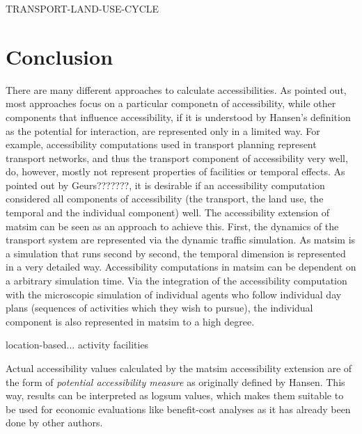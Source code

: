 
TRANSPORT-LAND-USE-CYCLE





\section{Conclusion}
There are many different approaches to calculate accessibilities. As pointed out, most approaches focus on a particular 
componetn of accessibility, while other components that influence accessibility, if it is understood by Hansen's definition 
as the potential for interaction, are represented only in a limited way. For example, accessibility computations used in 
transport planning represent transport networks, and thus the transport component of accessibility very well, do, however, 
mostly not represent properties of facilities or temporal effects. As pointed out by Geurs???????, it is desirable if an 
accessibility computation considered all components of accessibility (the transport, the land use, the temporal and the 
individual component) well. The accessibility extension of \gls{matsim} can be seen as an approach to achieve this. First, 
the dynamics of the transport system are represented via the dynamic traffic simulation. As \gls{matsim} is a simulation 
that runs second by second, the temporal dimension is represented in a very detailed way. Accessibility computations in 
\gls{matsim} can be dependent on a arbitrary simulation time. Via the integration of the accessibility computation with 
the microscopic simulation of individual agents who follow individual day plans (sequences of activities which they 
wish to pursue), the individual component is also represented in \gls{matsim} to a high degree.

location-based... activity facilities

Actual accessibility values calculated by the \gls{matsim} accessibility extension are of the form of \textit{potential 
	accessibility measure} as originally defined by Hansen. This way, results can be interpreted as \gls{logsum} values, 
which makes them suitable to be used for economic evaluations like benefit-cost analyses as it has already been done 
by other authors.




